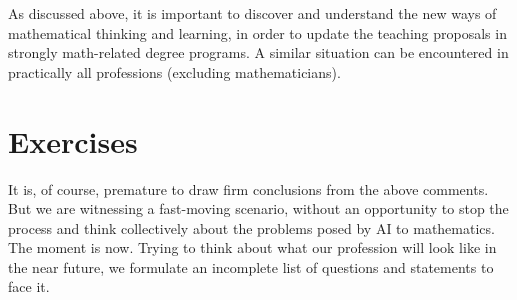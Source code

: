 \documentclass[12pt]{article}
\begin{document}
As discussed above,
it is important to discover and understand the new ways of mathematical thinking and learning,
in order to update the teaching proposals in strongly math-related degree programs.
A similar situation can be encountered in practically all professions (excluding mathematicians).

\section{Exercises}

It is, of course, premature to draw firm conclusions from the above comments.
But we are witnessing a fast-moving scenario,
without an opportunity to stop the process and think collectively
about the problems posed by AI to mathematics. The moment is now.
Trying to think about what our profession will look like in the near future,
we formulate an incomplete list of questions and statements to face it.
\end{document}
